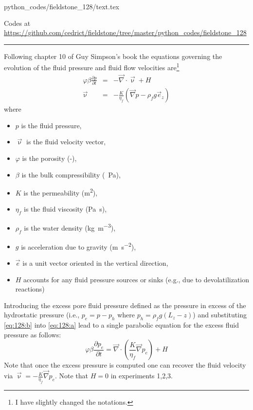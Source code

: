 \begin{flushright} {\tiny {\color{gray} python\_codes/fieldstone\_128/text.tex}} \end{flushright}



\begin{center}
Codes at \url{https://github.com/cedrict/fieldstone/tree/master/python_codes/fieldstone_128}
\end{center}

\par\noindent\rule{\textwidth}{0.4pt}


Following chapter 10 of Guy Simpson's book \cite{simp17} the equations
governing the evolution of the fluid pressure and fluid flow velocities are\footnote{I have slightly changed the notations.}
\begin{eqnarray}
\varphi \beta \frac{\partial p}{\partial t} &=& -\vec\nabla \cdot \vec \upnu + H \label{eq:128:a}\\
\vec\upnu &=& -\frac{K}{\eta_f} \left(\vec\nabla p - \rho_f g \vec{e}_z \right) \label{eq:128:b}
\end{eqnarray}
where
\begin{itemize}
\item $p$ is the fluid pressure, 
\item $\vec\upnu$ is the fluid velocity vector, 
\item $\varphi$ is the porosity (-), 
\item $\beta$ is the bulk compressibility (\si{\per\pascal}), 
\item $K$ is the permeability (\si{\square\meter}), 
\item $\eta_f$ is the fluid viscosity (\si{\pascal\second}), 
\item $\rho_f$ is the water density (\si{\kg\per\cubic\meter}), 
\item $g$ is acceleration due to gravity (\si{\meter\per\square\second}), 
\item $\vec{e}$ is a unit vector oriented in the vertical direction, 
\item $H$ accounts for any fluid pressure sources or sinks (e.g., due to devolatilization reactions)
\end{itemize}
Introducing the excess pore fluid pressure defined as the pressure in excess of the hydrostatic pressure 
(i.e., $p_e = p-p_h$ where $p_h = \rho_f g (L_z-z)$) and 
substituting \eqref{eq:128:b} into \eqref{eq:128:a} lead to a single parabolic equation for
the excess fluid pressure as follows:
\begin{equation}
\varphi \beta  \frac{\partial p_e}{\partial t}
=
\vec\nabla \cdot \left( \frac{K}{\eta_f} \vec\nabla p_e  \right) + H
\end{equation}
Note that once the excess pressure is computed one can recover the fluid velocity via 
$\vec\upnu=-\frac{K}{\eta_f} \vec\nabla p_e$. 
Note that $H=0$ in experiments 1,2,3.

